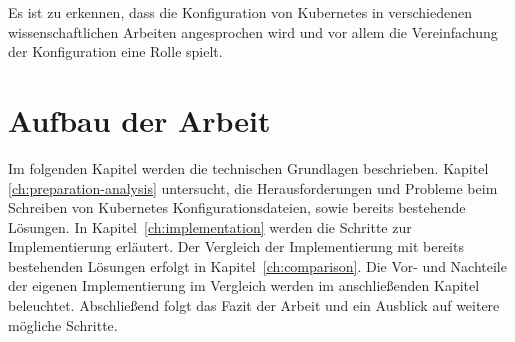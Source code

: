 Es ist zu erkennen, dass die Konfiguration von Kubernetes in verschiedenen wissenschaftlichen Arbeiten angesprochen wird und vor allem die Vereinfachung
der Konfiguration eine Rolle spielt.

\section{Aufbau der Arbeit}
Im folgenden Kapitel werden die technischen Grundlagen beschrieben.
Kapitel \ref{ch:preparation-analysis} untersucht, die Herausforderungen und Probleme beim Schreiben von Kubernetes Konfigurationsdateien, sowie bereits bestehende Lösungen.
In Kapitel~\ref{ch:implementation} werden die Schritte zur Implementierung erläutert.
Der Vergleich der Implementierung mit bereits bestehenden Lösungen erfolgt in Kapitel~\ref{ch:comparison}.
Die Vor- und Nachteile der eigenen Implementierung im Vergleich werden im anschließenden Kapitel beleuchtet.
Abschließend folgt das Fazit der Arbeit und ein Ausblick auf weitere mögliche Schritte.

